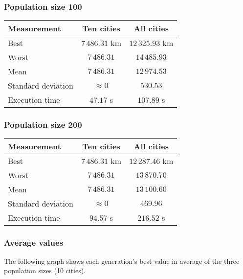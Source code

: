 \documentclass{article}
\begin{document}
\subsubsection*{Population size 100}

\begin{center}
\begin{tabular}{lcc}
\toprule
Measurement & Ten cities & All cities \\
\midrule
Best & $7\,486.31$ km & $12\,325.93$ km \\
Worst & $7\,486.31$ & $14\,485.93$ \\
Mean & $7\,486.31$ & $12\,974.53$ \\
Standard deviation & $\approx 0$ & $530.53$ \\
Execution time & $47.17$ s & $107.89$ s \\
\bottomrule
\end{tabular}
\end{center}

\subsubsection*{Population size 200}

\begin{center}
\begin{tabular}{lcc}
\toprule
Measurement & Ten cities & All cities \\
\midrule
Best & $7\,486.31$ km & $12\,287.46$ km \\
Worst & $7\,486.31$ & $13\,870.70$ \\
Mean & $7\,486.31$ & $13\,100.60$ \\
Standard deviation & $\approx 0$ & $469.96$ \\
Execution time & $94.57$ s & $216.52$ s \\
\bottomrule
\end{tabular}
\end{center}

\subsubsection*{Average values}

The following graph shows each generation's best value in average of the three population sizes (10 cities).
\end{document}
